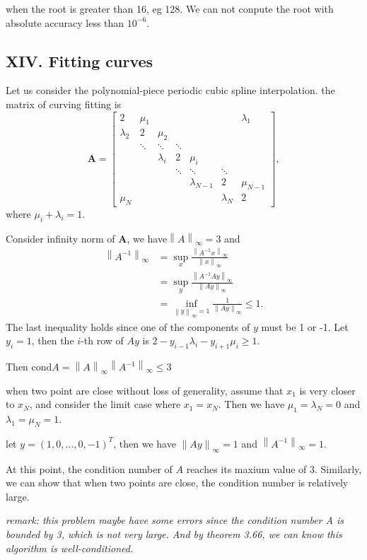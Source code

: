 \documentclass[a4paper]{article}
\newcommand{\norminf}[1]{\left\|#1\right\|_{\infty}}
\begin{document}
when the root is greater than 16, eg 128. We can not conpute the root with absolute accuracy less than $10^{-6}$.

\subsection*{XIV. Fitting curves}
Let us consider the polynomial-piece periodic cubic spline interpolation. the matrix of curving fitting is
\[\mathbf{A} =
  \begin{bmatrix}
    2 & \mu_1 &  &  & & & \lambda_1 \\
    \lambda_2 & 2 & \mu_2 &&  &  &  \\
     & \ddots & \ddots & \ddots &&  &  \\
     &  & \lambda_{i} & 2 & \mu_i & & \\
     &  &  & \ddots & \ddots & \ddots \\
     &  &  &   & \lambda_{N-1} & 2 & \mu_{N-1}\\
    \mu_N &  &   &   &  & \lambda_N & 2
    \end{bmatrix},
    \]
where $\mu_i + \lambda_i = 1.$

Consider infinity norm of $\mathbf{A}$, we have$\norminf{A} = 3$ and
\begin{align*}
  \norminf{A^{-1}} &= \sup_{x}\frac{\norminf{A^{-1}x}}{\norminf{x}}\\
  & = \sup_{y}\frac{\norminf{A^{-1}Ay}}{\norminf{Ay}}\\
& = \inf_{\norminf{y} = 1}\frac{1}{\norminf{Ay}} \leq 1.
\end{align*}
The last inequality holds since one of the components of $y$ must be 1 or -1. Let $y_i = 1$, then the $i$-th row of $Ay$ is $2 - y_{i-1} \lambda_{i} - y_{i+1} \mu_{i} \geq 1$.

Then $\text{cond} A = \norminf{A}\norminf{A^{-1}} \leq 3$

when two point are close without loss of generality, assume that $x_1$ is very closer to $x_N$, and consider the limit case where $x_1 =x_N$. Then we have $\mu_1 = \lambda_N = 0$ and $\lambda_1 = \mu_N = 1$.

let $y = (1,0,\ldots,0,-1)^T$, then we have $\norminf{Ay} = 1$ and $\norminf{A^{-1}} = 1$.

At this point, the condition number of $A$ reaches its maxium value of 3. Similarly, we can show that when two points are close, the condition number is relatively large.

\textit{remark: this problem maybe have some errors since the condition number A is bounded by 3, which is not very large. And by theorem 3.66, we can know this algorithm is well-conditioned.}
\end{document}
